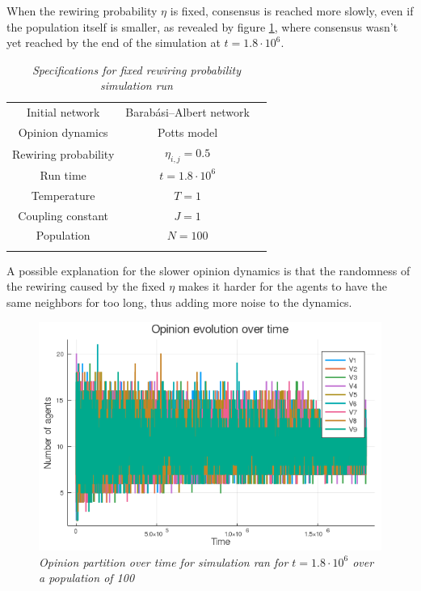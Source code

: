 \documentclass[12pt,openright,twoside]{book}
\begin{document}
When the rewiring probability $\eta$ is fixed, consensus is reached more slowly, even if the population itself is smaller, as revealed by figure \ref{2_2:partition}, where consensus wasn't yet reached by the end of the simulation at $t=1.8\cdot 10^6$.\\

\begin{table}[!ht]
\centering
\begin{small}
\caption{\textit{Specifications for fixed rewiring probability simulation run}}
\begin{tabular}{ccc}
\hline
Initial network             & Barabási–Albert network\\
Opinion dynamics            & Potts model \\
Rewiring probability        & $\eta_{i,j}=0.5$\\
Run time                    & $t=1.8\cdot 10^6$\\
Temperature                 & $T=1$ \\
Coupling constant           & $J=1$ \\
Population                  & $N=100$\\
\hline
\label{fixed-rewiring-specs}
\end{tabular}
\end{small}
\end{table}




A possible explanation for the slower opinion dynamics is that the randomness of the rewiring caused by the fixed $\eta$ makes it harder for the agents to have the same neighbors for too long, thus adding more noise to the dynamics.\\

\begin{figure}[!ht]
\centering
\includegraphics[width=0.65\linewidth]{figures/2_2/vote_evolution.png}
\caption{\textit{{\small Opinion partition over time for simulation ran for $t=1.8\cdot 10^6$ over a population of 100}}}
\label{2_2:partition}
\end{figure}
\end{document}
